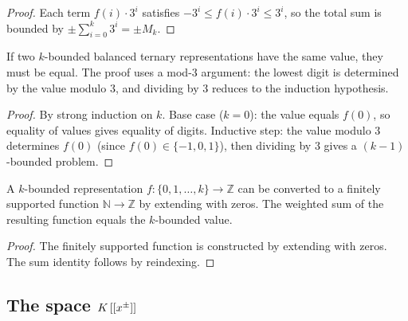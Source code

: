 \begin{proof}
\leanok
Each term $f(i) \cdot 3^i$ satisfies $-3^i \le f(i) \cdot 3^i \le 3^i$,
so the total sum is bounded by $\pm \sum_{i=0}^{k} 3^i = \pm M_k$.
\end{proof}

\begin{lemma}
\label{lem.fps.laure.balanced-ternary-injective}
If two $k$-bounded balanced ternary representations have the same value,
they must be equal. The proof uses a mod-$3$ argument:
the lowest digit is determined by the value modulo $3$, and dividing
by $3$ reduces to the induction hypothesis.
\end{lemma}

\begin{proof}
By strong induction on $k$. Base case ($k = 0$): the value equals
$f(0)$, so equality of values gives equality of digits.
Inductive step: the value modulo $3$ determines $f(0)$ (since
$f(0) \in \{-1, 0, 1\}$), then dividing by $3$ gives a
$(k-1)$-bounded problem.
\end{proof}

\begin{lemma}
\label{lem.fps.laure.kBoundedToFinsupp}
\leanhelper
\leanok
A $k$-bounded representation $f : \{0, 1, \ldots, k\} \to \mathbb{Z}$
can be converted to a finitely supported function
$\mathbb{N} \to \mathbb{Z}$ by extending with zeros.
The weighted sum of the resulting function equals the $k$-bounded value.
\end{lemma}

\begin{proof}
\leanok
The finitely supported function is constructed by extending with zeros.
The sum identity follows by reindexing.
\end{proof}

\subsection{The space $K\left[\left[x^{\pm}\right]\right]$}

